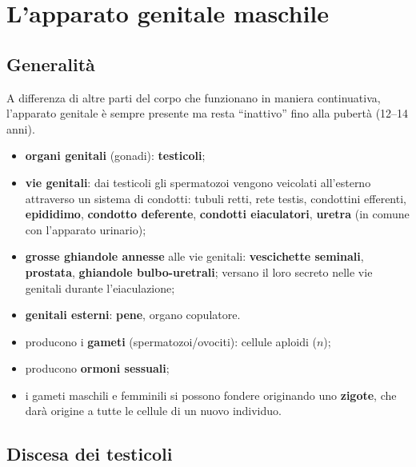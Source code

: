 \chapter{L'apparato genitale maschile}

\section{Generalità}

A differenza di altre parti del corpo che funzionano in maniera continuativa, l'apparato genitale
è sempre presente ma resta ``inattivo'' fino alla pubertà (12--14 anni).

\begin{itemize}
  \item \textbf{organi genitali} (gonadi): \textbf{testicoli};
  \item \textbf{vie genitali}: dai testicoli gli spermatozoi vengono veicolati all'esterno
    attraverso un sistema di condotti: tubuli retti, rete testis, condottini efferenti,
    \textbf{epididimo}, \textbf{condotto deferente}, \textbf{condotti eiaculatori}, \textbf{uretra}
    (in comune con l'apparato urinario);
  \item \textbf{grosse ghiandole annesse} alle vie genitali: \textbf{vescichette seminali},
    \textbf{prostata}, \textbf{ghiandole bulbo-uretrali}; versano il loro secreto nelle vie genitali
    durante l'eiaculazione;
  \item \textbf{genitali esterni}: \textbf{pene}, organo copulatore.
\end{itemize}

\begin{itemize}
  \item producono i \textbf{gameti} (spermatozoi/ovociti): cellule aploidi ($n$);
  \item producono \textbf{ormoni sessuali};
  \item i gameti maschili e femminili si possono fondere originando uno \textbf{zigote}, che darà
    origine a tutte le cellule di un nuovo individuo.
\end{itemize}

\section{Discesa dei testicoli}

